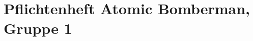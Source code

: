 \documentclass[12pt]{report}
\begin{document}
\section*{Pflichtenheft Atomic Bomberman, Gruppe 1}
\end{document}
